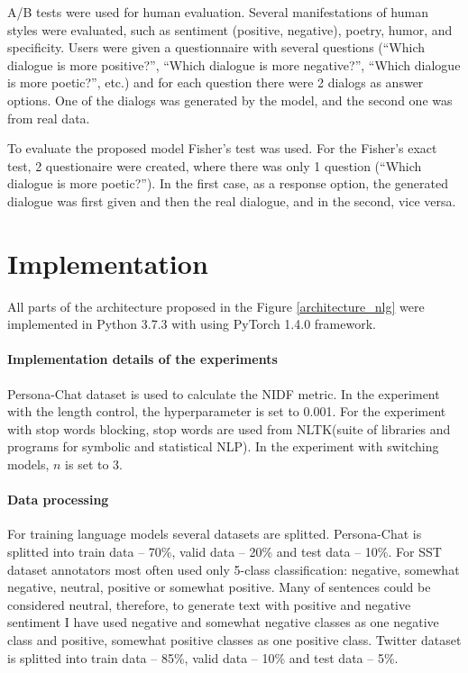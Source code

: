A/B tests were used for human evaluation. Several manifestations of human styles were evaluated, such as sentiment (positive, negative), poetry, humor, and specificity. Users were given a questionnaire with several questions (``Which dialogue is more positive?'', ``Which dialogue is more negative?'', ``Which dialogue is more poetic?'', etc.) and for each question there were 2 dialogs as answer options. One of the dialogs was generated by the model, and the second one was from real data.

To evaluate the proposed model Fisher's test was used. For the Fisher's exact test, 2 questionaire were created, where there was only 1 question (``Which dialogue is more poetic?''). In the first case, as a response option, the generated dialogue was first given and then the real dialogue, and in the second, vice versa.

\chapter{Implementation} \label{chap_implementation}
All parts of the architecture proposed in the Figure \ref{architecture_nlg} were implemented in Python 3.7.3 with using PyTorch 1.4.0 framework.

\subsubsection{Implementation details of the experiments}
Persona-Chat dataset is used to calculate the NIDF metric. In the experiment with the length control, the hyperparameter is set to 0.001. For the experiment with stop words blocking, stop words are used from NLTK\protect\footnotemark (suite of libraries and programs for symbolic and statistical NLP). In the experiment with switching models, $n$ is set to 3.


\subsubsection{Data processing}
For training language models several datasets are splitted. Persona-Chat is splitted into train data -- 70\%, valid data -- 20\% and test data -- 10\%. For SST dataset annotators most often used only 5-class classification: negative, somewhat negative, neutral, positive or somewhat positive. Many of sentences could be considered neutral, therefore, to generate text with positive and negative sentiment I have used negative and somewhat negative classes as one negative class and positive, somewhat positive classes as one positive class. Twitter dataset is splitted into train data -- 85\%, valid data -- 10\% and test data -- 5\%.

